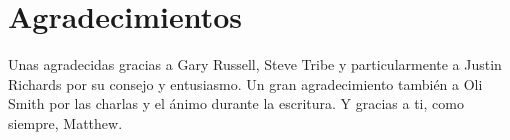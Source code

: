 \chapter*{Agradecimientos}

{Unas agradecidas gracias a Gary Russell, Steve Tribe y particularmente a Justin
	Richards por su consejo y entusiasmo. Un gran agradecimiento también a Oli Smith
	por las charlas y el ánimo durante la escritura. Y gracias a ti, como siempre,
Matthew.}
